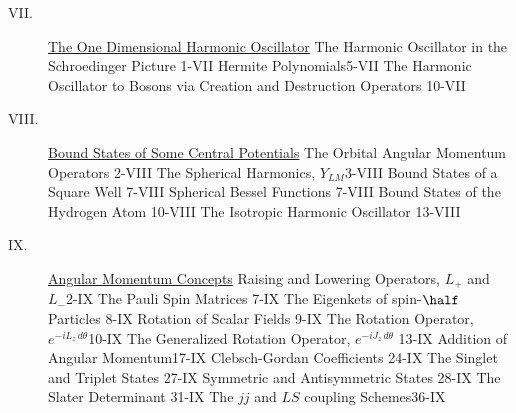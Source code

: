 \begin{description}
\item[VII.] \underline{The One Dimensional Harmonic Oscillator}
\subitem The Harmonic Oscillator in the Schroedinger Picture \hfill 1-VII
\subitem Hermite Polynomials\hfill 5-VII
\subitem The Harmonic Oscillator to Bosons via Creation and Destruction Operators \hfill 10-VII
 
\item[VIII.] \underline{Bound States of Some Central Potentials}
\subitem The Orbital Angular Momentum Operators \hfill 2-VIII
\subitem The Spherical Harmonics, $Y_{LM}$\hfill 3-VIII
\subitem Bound States of a Square Well \hfill 7-VIII
\subitem Spherical Bessel Functions \hfill 7-VIII
\subitem Bound States of the Hydrogen Atom \hfill 10-VIII
\subitem The Isotropic Harmonic Oscillator \hfill 13-VIII

\item[IX.]\underline{Angular Momentum Concepts}
\subitem Raising and Lowering Operators, $L_+$ and $L_-$\hfill 2-IX
\subitem The Pauli Spin Matrices \hfill 7-IX
\subitem The Eigenkets of spin-$\half$ Particles \hfill 8-IX
\subitem Rotation of Scalar Fields \hfill 9-IX
\subitem The Rotation Operator, $e^{-iL_z \,d\theta}$\hfill 10-IX
\subitem The Generalized Rotation Operator, $e^{-iJ_z \,d\theta}$ \hfill 13-IX
\subitem Addition of Angular Momentum\hfill 17-IX
\subitem Clebsch-Gordan Coefficients \hfill 24-IX
\subitem The Singlet and Triplet States \hfill 27-IX
\subitem Symmetric and Antisymmetric States \hfill 28-IX
\subitem The Slater Determinant \hfill 31-IX
\subitem The $jj$ and $LS$ coupling Schemes\hfill 36-IX

\end{description}